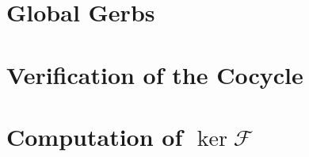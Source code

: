 \documentclass{article}
\numberwithin{equation}{section}
\begin{document}
\section{Global Gerbs} \label{sec:global}


\printbibliography[title={References}]

\newpage
\appendix
\section{Verification of the Cocycle} \label{sec:verifycocycle}


\section{Computation of \texorpdfstring{$\ker\mathcal F$}{ker F}} \label{sec:havegensproof}

\end{document}
